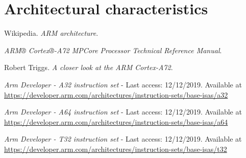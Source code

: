 \documentclass[12pt]{article}
\begin{document}
\section{Architectural characteristics}




\begin{thebibliography}{9}
Wikipedia.
\textit{ARM architecture}. 

 
\textit{ARM® Cortex®-A72 MPCore Processor Technical Reference Manual}.

 
Robert Triggs. \textit{A closer look at the ARM Cortex-A72}.


\textit{Arm Developer - A32 instruction set} - Last access: 12/12/2019. Available at \url{https://developer.arm.com/architectures/instruction-sets/base-isas/a32}



\textit{Arm Developer - A64 instruction set} - Last access: 12/12/2019. Available at \url{https://developer.arm.com/architectures/instruction-sets/base-isas/a64}

\textit{Arm Developer - T32 instruction set} - Last access: 12/12/2019. Available at \url{https://developer.arm.com/architectures/instruction-sets/base-isas/t32}

\end{thebibliography}
\end{document}
